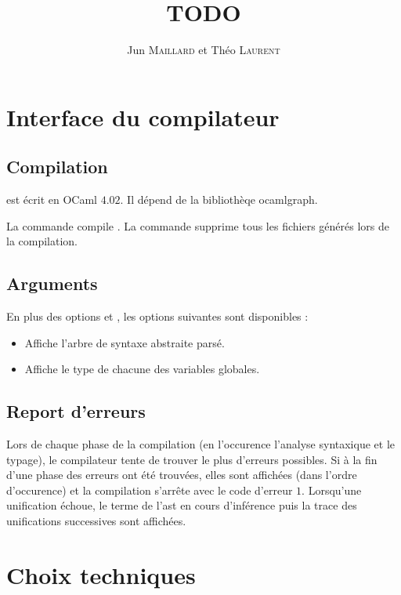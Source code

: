 \documentclass[a4paper]{article}
\title{TODO}
\author{Jun \textsc{Maillard} et Théo \textsc{Laurent}}
\begin{document}
\maketitle


\section{Interface du compilateur}

\subsection{Compilation}
 est écrit en OCaml $4.02$. Il dépend de la bibliothèqe ocamlgraph.

La commande  compile .
La commande  supprime tous les fichiers générés lors de la compilation.

\subsection{Arguments}
En plus des options  et , les options suivantes sont disponibles :
\begin{itemize}
\item[\PVerb{--print-ast}] Affiche l'arbre de syntaxe abstraite parsé.
\item[\PVerb{--print-type}] Affiche le type de chacune des variables globales.
\end{itemize}

\subsection{Report d'erreurs}
Lors de chaque phase de la compilation (en l'occurence l'analyse syntaxique et le typage), le compilateur tente de trouver le plus d'erreurs possibles. Si à la fin d'une phase des erreurs ont été trouvées, elles sont affichées (dans l'ordre d'occurence) et la compilation s'arrête avec le code d'erreur $1$.
Lorsqu'une unification échoue, le terme de l'ast en cours d'inférence puis la trace des unifications successives sont affichées.

\section{Choix techniques}
\end{document}
